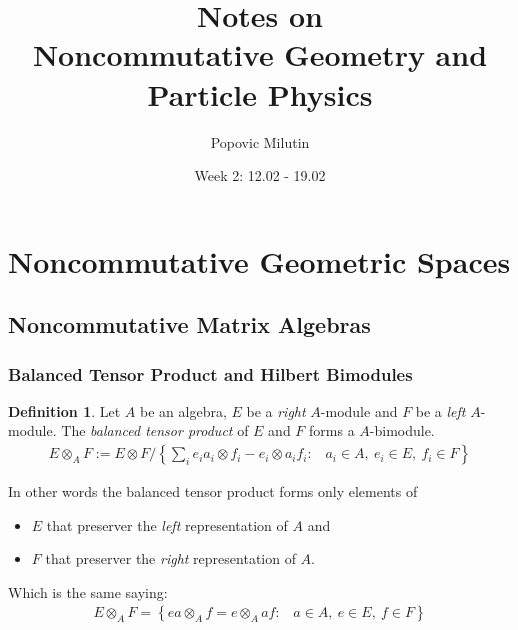 \documentclass[a4paper]{article}
\title{Notes on \\ Noncommutative Geometry and Particle Physics}
\author{Popovic Milutin}
\date{Week 2: 12.02 - 19.02}
\theoremstyle{definition}
\newtheorem{definition}{Definition}
\theoremstyle{definition}
\theoremstyle{definition}
\theoremstyle{theorem}
\theoremstyle{theorem}
\theoremstyle{theorem}
\theoremstyle{definition}
\begin{document}
\maketitle
\tableofcontents

\section{Noncommutative Geometric Spaces}
\subsection{Noncommutative Matrix Algebras}
\subsubsection{Balanced Tensor Product and Hilbert Bimodules}

\begin{definition}
    Let $A$ be an algebra, $E$ be a \textit{right} $A$-module and $F$ be a \textit{left} $A$-module.
    The \textit{balanced tensor product} of $E$ and $F$ forms a $A$-bimodule.
    \begin{align*}
        E \otimes _A F := E \otimes F /\left\{\sum _i e_i a_i \otimes f_i - e_i \otimes a_i f_i : \;\;\;
                                         a_i \in A,\ e_i \in E,\ f_i \in F \right\}
    \end{align*}
\end{definition}
In other words the balanced tensor product forms only elements of
\begin{itemize}
    \item $E$ that preserver the \textit{left} representation of $A$ and
    \item $F$ that preserver the \textit{right} representation of $A$.
\end{itemize}
Which is the same saying:
\begin{align*}
    E \otimes _A F = \left\{e a\otimes _A f = e \otimes _A a f: \;\;\; a \in A,\ e \in E,\ f \in F \right\}
\end{align*}
\end{document}
